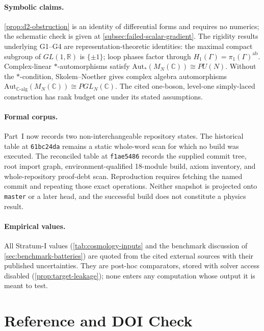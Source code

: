 \documentclass[12pt,a4paper,twoside]{article}
\theoremstyle{plain}
\theoremstyle{definition}
\theoremstyle{remark}
\begin{document}
\paragraph{Symbolic claims.}
\cref{prop:d2-obstruction} is an identity of differential forms and
requires no numerics; the schematic check is given at
\cref{subsec:failed-scalar-gradient}. The rigidity results underlying
G1--G4 are representation-theoretic identities: the maximal compact
subgroup of $GL(1,\mathbb{R})$ is $\{\pm 1\}$; loop phases factor
through $H_1(\Gamma) = \pi_1(\Gamma)^{\mathrm{ab}}$. Complex-linear
$*$-automorphisms satisfy $\mathrm{Aut}_{*}(M_N(\mathbb C))\cong PU(N)$.
Without the $*$-condition, Skolem--Noether gives complex algebra
automorphisms $\mathrm{Aut}_{\mathbb C\text{-alg}}(M_N(\mathbb C))
\cong PGL_N(\mathbb C)$. The cited one-boson, level-one simply-laced
construction has rank budget one under its stated assumptions.

\paragraph{Formal corpus.}
Part~I now records two non-interchangeable repository states. The historical
table at \texttt{61bc24da} remains a static whole-word scan for which no build
was executed. The reconciled table at \texttt{f1ae5486} records the supplied
commit tree, root import graph, environment-qualified 18-module build, axiom
inventory, and whole-repository proof-debt scan. Reproduction requires
fetching the named commit and repeating those exact operations. Neither
snapshot is projected onto \texttt{master} or a later head, and the successful
build does not constitute a physics result.

\paragraph{Empirical values.}
All Stratum-I values (\cref{tab:cosmology-inputs} and the benchmark
discussion of \cref{sec:benchmark-batteries}) are quoted from the cited
external sources with their published uncertainties. They are post-hoc
comparators, stored with solver access disabled
(\cref{prop:target-leakage}); none enters any computation whose output
it is meant to test.

\newpage
\section{Reference and DOI Check}
\label{sec:doi-check}
\end{document}
